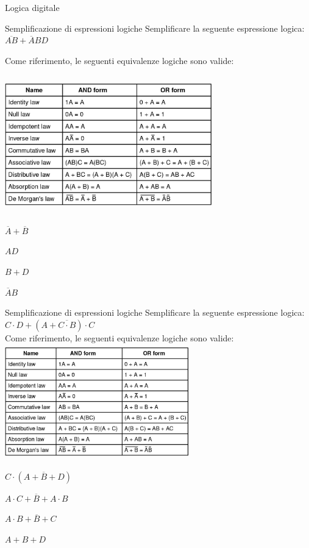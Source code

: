 \documentclass[11pt]{article}
\begin{document}
\begin{quiz}{Logica digitale}
\begin{multi}[points=1,shuffle=true]{Semplificazione di espressioni logiche}
    Semplificare la seguente espressione logica: $ \overline{AB} +  \overline{A}BD$

    Come riferimento, le seguenti equivalenze logiche sono valide:

    \includegraphics[width=9cm,height=6cm]{figures/logica.png}

    \item* $\overline{A}+\overline{B}$
    \item $AD$
    \item $B + D$
    \item $\overline{A}B$
\end{multi}


\begin{multi}[points=1,shuffle=true]{Semplificazione di espressioni logiche}
    Semplificare la seguente espressione logica: \\
    $C \cdot D + (A + \overline{C \cdot B}) \cdot C$\\

    Come riferimento, le seguenti equivalenze logiche sono valide:\\

    \includegraphics[width=8cm,height=5cm]{figures/logica.png}

    \item* $C \cdot  (A + \overline{B} + D)$
    \item $A \cdot C + \overline{B} +  A \cdot B$
    \item $A \cdot B + \overline{B} + C $
    \item $A + B + D$
\end{multi}


\end{quiz}
\end{document}
